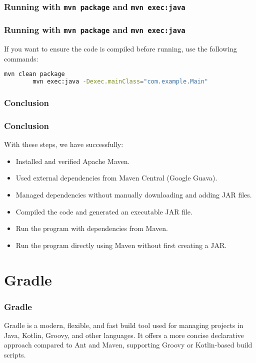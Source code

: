 \documentclass[aspectratio=169, table]{beamer}
\begin{document}
\subsubsection{Running with \texttt{mvn package} and \texttt{mvn exec:java}}
\begin{frame}[fragile]
	\frametitle{\LARGE{Running with \texttt{mvn package} and \texttt{mvn exec:java}}}
	If you want to ensure the code is compiled before running, use the following commands:
	\begin{lstlisting}[language=bash]
		mvn clean package
		mvn exec:java -Dexec.mainClass="com.example.Main"
	\end{lstlisting}
\end{frame}

\subsubsection{Conclusion}
\begin{frame}
	\frametitle{Conclusion}
	With these steps, we have successfully:
	\begin{itemize}
		\item Installed and verified Apache Maven.
		\item Used external dependencies from Maven Central (Google Guava).
		\item Managed dependencies without manually downloading and adding JAR files.
		\item Compiled the code and generated an executable JAR file.
		\item Run the program with dependencies from Maven.
		\item Run the program directly using Maven without first creating a JAR.
	\end{itemize}
\end{frame}

\section{Gradle}
\begin{frame}[fragile]
	\frametitle{Gradle}
	Gradle is a modern, flexible, and fast build tool used for managing projects in Java, Kotlin, Groovy, and other languages. It offers a more concise declarative approach compared to Ant and Maven, supporting Groovy or Kotlin-based build scripts.
\end{frame}
\end{document}

